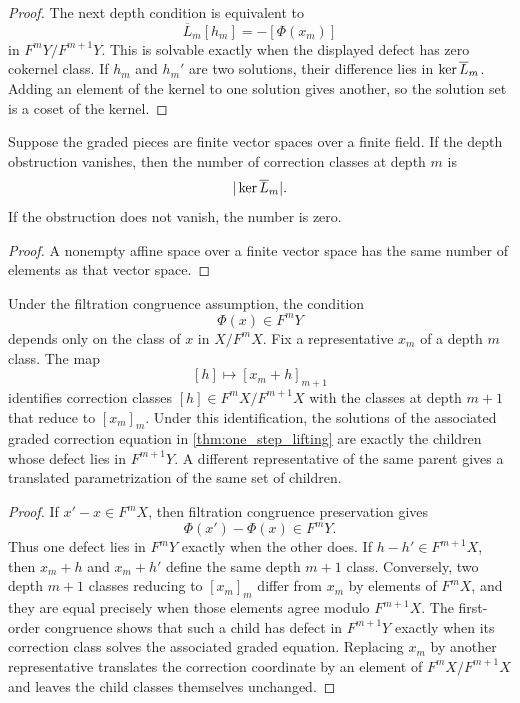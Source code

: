 \begin{proof}
The next depth condition is equivalent to
\[
\overline L_m[h_m]
=-[\Phi(x_m)]
\]
in $F^mY/F^{m+1}Y$.  This is solvable exactly when the displayed defect has zero cokernel class.  If $h_m$ and $h_m'$ are two solutions, their difference lies in $\operatorname{ker}\overline L_m$.  Adding an element of the kernel to one solution gives another, so the solution set is a coset of the kernel.
\end{proof}

\begin{corollary}\label{cor:finite_branch_count}
Suppose the graded pieces are finite vector spaces over a finite field.  If the depth obstruction vanishes, then the number of correction classes at depth $m$ is
\[
|\operatorname{ker}\overline L_m|.
\]
If the obstruction does not vanish, the number is zero.
\end{corollary}

\begin{proof}
A nonempty affine space over a finite vector space has the same number of elements as that vector space.
\end{proof}


\begin{lemma}\label{lem:well_defined_lift_classes}
Under the filtration congruence assumption, the condition
\[
\Phi(x)\in F^mY
\]
depends only on the class of $x$ in $X/F^mX$.  Fix a representative $x_m$ of a depth $m$ class.  The map
\[
[h]\longmapsto[x_m+h]_{m+1}
\]
identifies correction classes $[h]\in F^mX/F^{m+1}X$ with the classes at depth $m+1$ that reduce to $[x_m]_m$.  Under this identification, the solutions of the associated graded correction equation in \cref{thm:one_step_lifting} are exactly the children whose defect lies in $F^{m+1}Y$.  A different representative of the same parent gives a translated parametrization of the same set of children.
\end{lemma}

\begin{proof}
If $x'-x\in F^mX$, then filtration congruence preservation gives
\[
\Phi(x')-\Phi(x)\in F^mY.
\]
Thus one defect lies in $F^mY$ exactly when the other does.  If $h-h'\in F^{m+1}X$, then $x_m+h$ and $x_m+h'$ define the same depth $m+1$ class.  Conversely, two depth $m+1$ classes reducing to $[x_m]_m$ differ from $x_m$ by elements of $F^mX$, and they are equal precisely when those elements agree modulo $F^{m+1}X$.  The first-order congruence shows that such a child has defect in $F^{m+1}Y$ exactly when its correction class solves the associated graded equation.  Replacing $x_m$ by another representative translates the correction coordinate by an element of $F^mX/F^{m+1}X$ and leaves the child classes themselves unchanged.
\end{proof}

